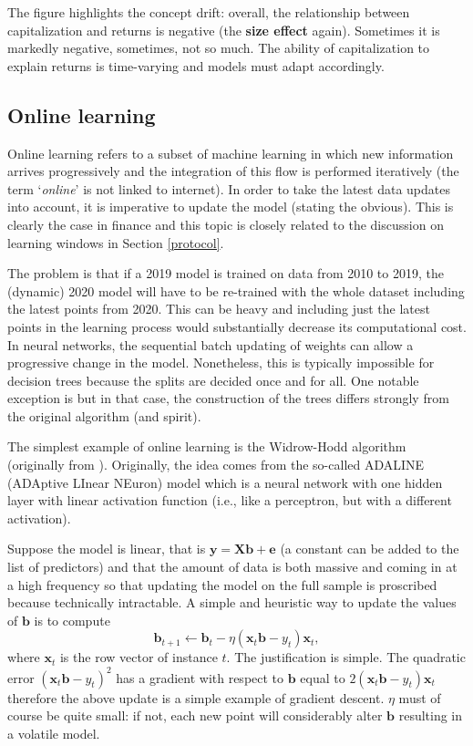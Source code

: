 \documentclass[]{krantz}
\theoremstyle{definition}
\theoremstyle{definition}
\theoremstyle{definition}
\theoremstyle{remark}
\begin{document}
\normalsize

The figure highlights the concept drift: overall, the relationship
between capitalization and returns is negative (the \textbf{size effect}
again). Sometimes it is markedly negative, sometimes, not so much. The
ability of capitalization to explain returns is time-varying and models
must adapt accordingly.

\hypertarget{online-learning}{%
\subsection{Online learning}\label{online-learning}}

Online learning refers to a subset of machine learning in which new
information arrives progressively and the integration of this flow is
performed iteratively (the term `\emph{online}' is not linked to
internet). In order to take the latest data updates into account, it is
imperative to update the model (stating the obvious). This is clearly
the case in finance and this topic is closely related to the discussion
on learning windows in Section \ref{protocol}.

The problem is that if a 2019 model is trained on data from 2010 to
2019, the (dynamic) 2020 model will have to be re-trained with the whole
dataset including the latest points from 2020. This can be heavy and
including just the latest points in the learning process would
substantially decrease its computational cost. In neural networks, the
sequential batch updating of weights can allow a progressive change in
the model. Nonetheless, this is typically impossible for decision trees
because the splits are decided once and for all. One notable exception
is \citet{basak2004online} but in that case, the construction of the
trees differs strongly from the original algorithm (and spirit).

The simplest example of online learning is the Widrow-Hodd algorithm
(originally from \citet{widrow1960adaptive}). Originally, the idea comes
from the so-called ADALINE (ADAptive LInear NEuron) model which is a
neural network with one hidden layer with linear activation function
(i.e., like a perceptron, but with a different activation).

Suppose the model is linear, that is
\(\textbf{y}=\textbf{Xb}+\textbf{e}\) (a constant can be added to the
list of predictors) and that the amount of data is both massive and
coming in at a high frequency so that updating the model on the full
sample is proscribed because technically intractable. A simple and
heuristic way to update the values of \(\textbf{b}\) is to compute
\[\textbf{b}_{t+1} \longleftarrow \textbf{b}_t-\eta (\textbf{x}_t\textbf{b}-y_t)\textbf{x}_t,\]
where \(\textbf{x}_t\) is the row vector of instance \(t\). The
justification is simple. The quadratic error
\((\textbf{x}_t\textbf{b}-y_t)^2\) has a gradient with respect to
\(\textbf{b}\) equal to \(2(\textbf{x}_t\textbf{b}-y_t)\textbf{x}_t\)
therefore the above update is a simple example of gradient descent.
\(\eta\) must of course be quite small: if not, each new point will
considerably alter \(\textbf{b}\) resulting in a volatile model.
\end{document}
